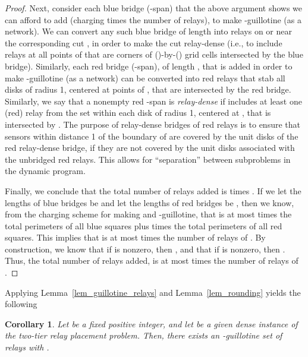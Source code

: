 \documentclass[11pt,a4paper]{article}
\newtheorem{corollary}{Corollary}
\theoremstyle{definition}
\theoremstyle{remark}
\begin{document}
\begin{enumerate}
\begin{proof}
Next, consider each blue bridge (-span) that the above argument
shows we can afford to add (charging  times the number of
relays), to make  -guillotine (as a network).  We can convert
any such blue bridge of length  into 
relays on or near the corresponding cut , in order to make the
cut relay-dense (i.e., to include relays at all points of  that
are corners of ()-by-() grid cells intersected by the blue
bridge).
Similarly, each red bridge (-span), of length , that is added in order to make
 -guillotine (as a network) can be converted into 
red relays that stab all disks of radius 1, centered at points of , that are
intersected by the red bridge.
Similarly, we say that a nonempty red -span is {\em relay-dense} if
 includes at least one (red) relay from the set  within each disk of radius 1,
centered at , that is intersected by .
The purpose of relay-dense bridges of red relays is to ensure that
sensors within distance 1 of the boundary of  are covered by the unit disks
of the red relay-dense bridge, if they are not covered by
the unit disks associated with the  unbridged red relays.  This allows for ``separation''
between subproblems in the dynamic program.

Finally, we conclude that the total number of relays added is 
times .  If we let the lengths of blue bridges be
 and let the lengths of red bridges be
, then we know, from the charging scheme for making
 and  -guillotine, that  is at most  times the total
perimeters of all blue squares plus  times the total
perimeters of all red squares.  This implies that  is at most  times
the number of relays of .  By construction, we know that if
 is nonzero, then , and that
if  is nonzero, then .  Thus,
the total number of relays added,  is at most  times the number
of relays of .
\end{proof}


Applying Lemma~\ref{lem_guillotine_relays} and Lemma~\ref{lem_rounding} yields the following

\begin{corollary}
Let  be a fixed positive integer, and let  be a given dense instance of
the two-tier relay placement problem.
Then, there exists an -guillotine
set  of relays with .
\end{corollary}


\end{enumerate}
\end{document}
